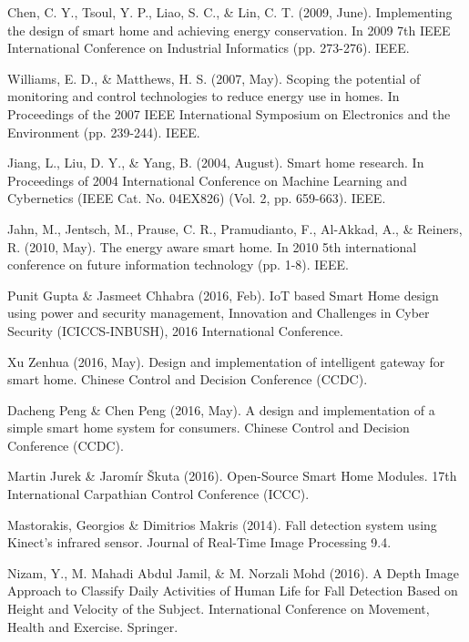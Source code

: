 \begin{thebibliography}{}

Chen, C. Y., Tsoul, Y. P., Liao, S. C., \& Lin, C. T. (2009, June). Implementing the design of smart home and achieving energy conservation. In 2009 7th IEEE International Conference on Industrial Informatics (pp. 273-276). IEEE.

Williams, E. D., \& Matthews, H. S. (2007, May). Scoping the potential of monitoring and control technologies to reduce energy use in homes. In Proceedings of the 2007 IEEE International Symposium on Electronics and the Environment (pp. 239-244). IEEE.

Jiang, L., Liu, D. Y., \& Yang, B. (2004, August). Smart home research. In Proceedings of 2004 International Conference on Machine Learning and Cybernetics (IEEE Cat. No. 04EX826) (Vol. 2, pp. 659-663). IEEE. 

Jahn, M., Jentsch, M., Prause, C. R., Pramudianto, F., Al-Akkad, A., \& Reiners, R. (2010, May). The energy aware smart home. In 2010 5th international conference on future information technology (pp. 1-8). IEEE.

Punit Gupta \& Jasmeet Chhabra (2016, Feb). IoT based Smart Home design using power and security management,  Innovation and Challenges in Cyber Security (ICICCS-INBUSH), 2016 International Conference.

Xu Zenhua (2016, May). Design and implementation of intelligent gateway for smart home. Chinese Control and Decision Conference (CCDC).

Dacheng Peng \& Chen Peng (2016, May). A design and implementation of a  simple smart home system for consumers. Chinese Control and Decision Conference (CCDC).

Martin Jurek \& Jaromír Škuta (2016). Open-Source Smart Home Modules. 17th International Carpathian Control Conference (ICCC).

Mastorakis, Georgios \& Dimitrios Makris (2014). Fall detection system using Kinect’s infrared sensor. Journal of Real-Time Image Processing 9.4.

Nizam, Y., M. Mahadi Abdul Jamil, \& M. Norzali Mohd (2016). A Depth Image Approach to Classify Daily Activities of Human Life for Fall Detection Based on Height and Velocity of the Subject. International Conference on Movement, Health and Exercise. Springer.


\end{thebibliography}
